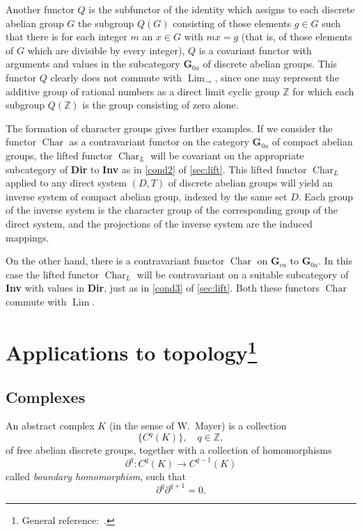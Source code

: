 \documentclass[11pt,a4paper]{report}
\DeclareMathOperator{\Lim}{Lim}
\DeclareMathOperator{\chr}{Char}
\begin{document}
Another functor $Q$ is the subfunctor of the identity which assigns to each discrete abelian group $G$ the subgroup
$Q(G)$ consisting of those elements $g\in G$ such that there is for each integer $m$ an $x\in G$ with $mx=g$ 
(that is, of those elements of $G$ which are divisible by every integer), $Q$ is a covariant functor with arguments
and values in the subcategory $\mathbf{G}_{0a}$ of discrete abelian groups. This functor $Q$ clearly does not
commute with $\Lim_{\rightarrow}$, since one may represent the additive group of rational numbers as a direct limit
cyclic group $\mathbb{Z}$ for which each subgroup $Q(\mathbb{Z})$ is the group consisting of zero alone.

The formation of character groups gives further examples. If we consider the functor $\chr$ as a contravariant
functor on the category $\mathbf{G}_{0a}$ of compact abelian groups, the lifted functor $\chr_L$ will be covariant
on the appropriate subcategory of \textbf{Dir} to \textbf{Inv} as in \cref{cond2} of \cref{sec:lift}. This lifted functor
$\chr_L$ applied to any direct system $(D,T)$ of discrete abelian groups will yield an inverse system of compact
abelian group, indexed by the same set $D$. Each group of the inverse system is the character group of the
corresponding group of the direct system, and the projections of the inverse system are the induced mappings.

On the other hand, there is a contravariant functor $\chr$ on $\mathbf{G}_{ca}$ to $\mathbf{G}_{0a}$. In this case
the lifted functor $\chr_L$ will be contravariant on a suitable subcategory of \textbf{Inv} with values in 
\textbf{Dir}, just as in \cref{cond3} of \cref{sec:lift}. Both these functors $\chr$ commute with $\Lim$.

\chapter[Applications to topology]{Applications to topology\footnote{General reference:~\cite{lef1942}.}}\label{ch:topology}
\section{Complexes}\label{sec:comp}
An abstract complex $K$ (in the sense of W.~Mayer) is a collection
\begin{equation*}
	\{C^q(K)\},\quad q\in\mathbb{Z},
\end{equation*}
of free abelian discrete groups, together with a collection of homomorphisms
\begin{equation*}
	\partial^q:C^q(K)\rightarrow C^{q-1}(K)
\end{equation*}
called \emph{boundary homomorphism}, such that
\begin{equation*}
	\partial^q\partial^{q+1}=0.
\end{equation*}
\end{document}
